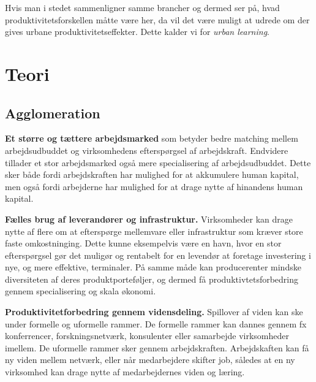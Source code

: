 \documentclass[a4paper, 12pt, titlepage]{article}
\begin{document}
Hvis man i stedet sammenligner samme brancher og dermed ser på, hvad produktivitetsforskellen måtte være her, da vil det være muligt at udrede om der gives urbane produktivitetseffekter. Dette kalder vi for \emph{urban learning}.
\section{Teori}
\subsection{Agglomeration}

\textbf{Et større og tættere arbejdsmarked} som betyder bedre matching mellem arbejdsudbuddet og virksomhedens efterspørgsel af arbejdskraft. Endvidere tillader et stor arbejdsmarked også mere specialisering af arbejdsudbuddet. Dette sker både fordi arbejdskraften har mulighed for at akkumulere human kapital, men også fordi arbejderne har mulighed for at drage nytte af hinandens human kapital.  

\textbf{Fælles brug af leverandører og infrastruktur.} Virksomheder kan drage nytte af flere om at efterspørge mellemvare eller infrastruktur som kræver store faste omkostninging. Dette kunne eksempelvis være en havn, hvor en stor efterspørgsel gør det muligør og rentabelt for en levendør  at foretage investering i nye, og mere effektive, terminaler. På samme måde kan producerenter mindske diversiteten af deres produktporteføljer, og dermed få produktivtetsforbedring gennem specialisering og skala økonomi.    

\textbf{Produktivitetforbedring gennem vidensdeling.} Spillover af viden kan ske under formelle og uformelle rammer. De formelle rammer kan dannes gennem fx konferrencer, forskningsnetværk, konsulenter eller samarbejde virksomheder imellem. De uformelle rammer sker gennem arbejdskraften. Arbejdskaften kan få ny viden mellem netværk, eller når medarbejdere skifter job, således at en ny virksomhed kan drage nytte af medarbejdernes viden og læring. \cite{sorensen2014infrastruktur}  
\end{document}
